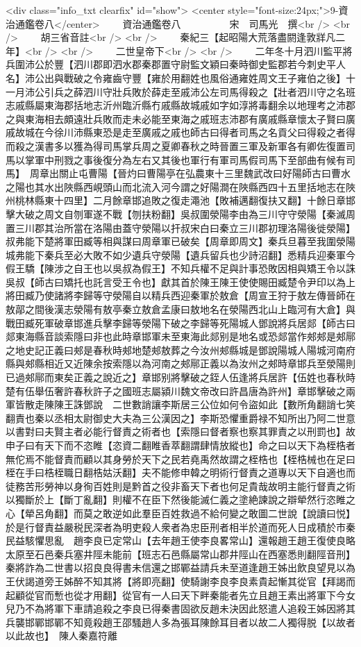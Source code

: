 <div class="info_txt clearfix" id="show">
<center style="font-size:24px;">9-資治通鑑卷八</center>
  　　資治通鑑卷八　　　　　宋　司馬光　撰<br />
<br />
　　胡三省音註<br />
<br />
　　秦紀三【起昭陽大荒落盡閼逢敦牂凡二年】<br />
<br />
　　二世皇帝下<br />
<br />
　　二年冬十月泗川監平將兵圍沛公於豐【泗川郡即泗水郡秦郡置守尉監文穎曰秦時御史監郡若今刺史平人名】沛公出與戰破之令雍齒守豐【雍於用翻姓也風俗通雍姓周文王子雍伯之後】十一月沛公引兵之薛泗川守壯兵敗於薛走至戚沛公左司馬得殺之【壯者泗川守之名班志戚縣屬東海郡括地志沂州臨沂縣冇戚縣故城戚如字如淳將毒翻余以地理考之沛郡之與東海相去頗遠壯兵敗而走未必能至東海之戚班志沛郡有廣戚縣章懷太子賢曰廣戚故城在今徐川沛縣東恐是走至廣戚之戚也師古曰得者司馬之名貢父曰得殺之者得而殺之漢書多以獲為得司馬掌兵周之夏卿春秋之時晉置三軍及新軍各有卿佐復置司馬以掌軍中刑戮之事後復分為左右又其後也軍行有軍司馬假司馬下至部曲有候有司馬】　周章出關止屯曹陽【晉灼曰曹陽亭在弘農東十三里魏武改曰好陽師古曰曹水之陽也其水出陜縣西峴頭山而北流入河今謂之好陽澗在陜縣西四十五里括地志在陜州桃林縣東十四里】二月餘章邯追敗之復走澠池【敗補邁翻復扶又翻】十餘日章邯擊大破之周文自刎軍遂不戰【刎扶粉翻】吳叔圍滎陽李由為三川守守滎陽【秦滅周置三川郡其治所當在洛陽由蓋守滎陽以扞叔宋白曰秦立三川郡初理洛陽後徙滎陽】叔弗能下楚將軍田臧等相與謀曰周章軍已破矣【周章即周文】秦兵旦暮至我圍滎陽城弗能下秦兵至必大敗不如少遺兵守滎陽【遺兵留兵也少詩沼翻】悉精兵迎秦軍今假王驕【陳涉之自王也以吳叔為假王】不知兵權不足與計事恐敗因相與矯王令以誅吳叔【師古曰矯托也託言受王令也】獻其首於陳王陳王使使賜田臧楚令尹印以為上將田臧乃使諸將李歸等守滎陽自以精兵西迎秦軍於敖倉【周宣王狩于敖左傳晉師在敖鄗之間後漢志滎陽有敖亭秦立敖倉孟康曰敖地名在滎陽西北山上臨河有大倉】與戰田臧死軍破章邯進兵擊李歸等滎陽下破之李歸等死陽城人鄧說將兵居郯【師古曰郯東海縣音談索隱曰非也此時章邯軍未至東海此郯别是地名或恐郯當作郟郟是郟鄏之地史記正義曰郟是春秋時郟地楚郟敖葬之今汝州郟縣城是鄧說陽城人陽城河南府縣與郟縣相近又近陳余按索隱以為河南之郟鄏正義以為汝州之郟時章邯兵至滎陽則已過郟鄏而東矣正義之說近之】章邯别將擊破之銍人伍逢將兵居許【伍姓也春秋時楚有伍舉伍奢許春秋許子之國班志屬潁川魏文帝改曰許昌唐為許州】章邯擊破之兩軍皆散走陳陳王誅鄧說　二世數誚讓李斯居三公位如何令盜如此【數所角翻誚七笑翻責也秦以丞相太尉御史大夫為三公漢因之】李斯恐懼重爵禄不知所出乃阿二世意以書對曰夫賢主者必能行督責之術者也【索隱曰督者察也察其罪責之以刑罰也】故申子曰有天下而不恣睢【恣資二翻睢香萃翻謂肆情放縱也】命之曰以天下為桎梏者無佗焉不能督責而顧以其身勞於天下之民若堯禹然故謂之桎梏也【桎梏械也在足曰桎在手曰梏桎職日翻梏姑沃翻】夫不能修申韓之明術行督責之道專以天下自適也而徒務苦形勞神以身徇百姓則是黔首之役非畜天下者也何足貴哉故明主能行督責之術以獨斷於上【斷丁亂翻】則權不在臣下然後能滅仁義之塗絶諫說之辯犖然行恣睢之心【犖呂角翻】而莫之敢逆如此羣臣百姓救過不給何變之敢圖二世說【說讀曰悦】於是行督責益嚴税民深者為明吏殺人衆者為忠臣刑者相半於道而死人日成積於市秦民益駭懼思亂　趙李良已定常山【去年趙王使李良畧常山】還報趙王趙王復使良略太原至石邑秦兵塞井陘未能前【班志石邑縣屬常山郡井陘山在西塞悉則翻陘音刑】秦將詐為二世書以招良良得書未信還之邯鄲益請兵未至道逢趙王姊出飲良望見以為王伏謁道旁王姊醉不知其將【將即亮翻】使騎謝李良李良素貴起慚其從官【拜謁而起顧從官而慙也從才用翻】從官有一人曰天下畔秦能者先立且趙王素出將軍下今女兒乃不為將軍下車請追殺之李良已得秦書固欲反趙未決因此怒遣人追殺王姊因將其兵襲邯鄲邯鄲不知竟殺趙王邵騷趙人多為張耳陳餘耳目者以故二人獨得脱【以故者以此故也】　陳人秦嘉符離